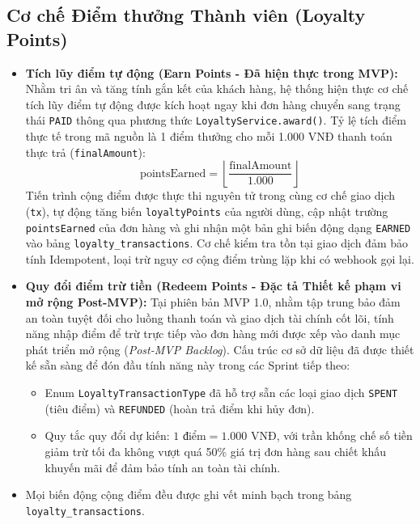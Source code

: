\subsection{Cơ chế Điểm thưởng Thành viên (Loyalty Points)}
\begin{itemize}
    \item \textbf{Tích lũy điểm tự động (Earn Points - Đã hiện thực trong MVP):}
    Nhằm tri ân và tăng tính gắn kết của khách hàng, hệ thống hiện thực cơ chế tích lũy điểm tự động được kích hoạt ngay khi đơn hàng chuyển sang trạng thái \texttt{PAID} thông qua phương thức \texttt{LoyaltyService.award()}. Tỷ lệ tích điểm thực tế trong mã nguồn là 1 điểm thưởng cho mỗi 1.000 VNĐ thanh toán thực trả (\texttt{finalAmount}):
    \[
    \text{pointsEarned} = \left\lfloor \frac{\text{finalAmount}}{1.000} \right\rfloor
    \]
    Tiến trình cộng điểm được thực thi nguyên tử trong cùng cơ chế giao dịch (\texttt{tx}), tự động tăng biến \texttt{loyaltyPoints} của người dùng, cập nhật trường \texttt{pointsEarned} của đơn hàng và ghi nhận một bản ghi biến động dạng \texttt{EARNED} vào bảng \texttt{loyalty\_transactions}. Cơ chế kiểm tra tồn tại giao dịch đảm bảo tính Idempotent, loại trừ nguy cơ cộng điểm trùng lặp khi có webhook gọi lại.

    \item \textbf{Quy đổi điểm trừ tiền (Redeem Points - Đặc tả Thiết kế phạm vi mở rộng Post-MVP):}
    Tại phiên bản MVP 1.0, nhằm tập trung bảo đảm an toàn tuyệt đối cho luồng thanh toán và giao dịch tài chính cốt lõi, tính năng nhập điểm để trừ trực tiếp vào đơn hàng mới được xếp vào danh mục phát triển mở rộng (\textit{Post-MVP Backlog}). Cấu trúc cơ sở dữ liệu đã được thiết kế sẵn sàng để đón đầu tính năng này trong các Sprint tiếp theo:
    \begin{itemize}
        \item Enum \texttt{LoyaltyTransactionType} đã hỗ trợ sẵn các loại giao dịch \texttt{SPENT} (tiêu điểm) và \texttt{REFUNDED} (hoàn trả điểm khi hủy đơn).
        \item Quy tắc quy đổi dự kiến: \(1 \text{ điểm} = 1.000 \text{ VNĐ}\), với trần khống chế số tiền giảm trừ tối đa không vượt quá 50\% giá trị đơn hàng sau chiết khấu khuyến mãi để đảm bảo tính an toàn tài chính.
    \end{itemize}
    \item Mọi biến động cộng điểm đều được ghi vết minh bạch trong bảng \texttt{loyalty\_transactions}.
\end{itemize}
